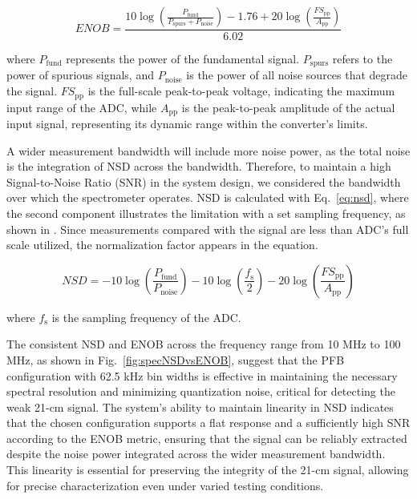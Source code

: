 \documentclass[fleqn,usenatbib]{rasti}
\begin{document}
\begin{equation}
    ENOB = \frac{10 \log\left(\frac{P_{\text{fund}}}{P_{\text{spurs}} + P_{\text{noise}}}\right) - 1.76 + 20 \log\left(\frac{FS_{\text{pp}}}{A_{\text{pp}}}\right)}{6.02}
    \label{eq:enob}
\end{equation}

where \( P_{\text{fund}} \) represents the power of the fundamental signal. \( P_{\text{spurs}} \) refers to the power of spurious signals, and \( P_{\text{noise}} \) is the power of all noise sources that degrade the signal. \( FS_{\text{pp}} \) is the full-scale peak-to-peak voltage, indicating the maximum input range of the ADC, while \( A_{\text{pp}} \) is the peak-to-peak amplitude of the actual input signal, representing its dynamic range within the converter's limits.

A wider measurement bandwidth will include more noise power, as the total noise is the integration of NSD across the bandwidth. Therefore, to maintain a high Signal-to-Noise Ratio (SNR) in the system design, we considered the bandwidth over which the spectrometer operates. NSD is calculated with Eq.~\ref{eq:nsd}, where the second component illustrates the limitation with a set sampling frequency, as shown in \cite{XilinxRF2017}. Since measurements compared with the signal are less than ADC's full scale utilized, the normalization factor appears in the equation.

\begin{equation}
    NSD = -10 \log\left(\frac{P_{\text{fund}}}{P_{\text{noise}}}\right) - 10\log\left(\frac{f_{\text{s}}}{2}\right) - 20\log\left(\frac{FS_{\text{pp}}}{A_{\text{pp}}}\right)
    \label{eq:nsd}
\end{equation}

where \( f_{\text{s}} \) is the sampling frequency of the ADC.

The consistent NSD and ENOB across the frequency range from 10 MHz to 100 MHz, as shown in Fig.~\ref{fig:specNSDvsENOB}, suggest that the PFB configuration with 62.5 kHz bin widths is effective in maintaining the necessary spectral resolution and minimizing quantization noise, critical for detecting the weak 21-cm signal. The system's ability to maintain linearity in NSD indicates that the chosen configuration supports a flat response and a sufficiently high SNR according to the ENOB metric, ensuring that the signal can be reliably extracted despite the noise power integrated across the wider measurement bandwidth. This linearity is essential for preserving the integrity of the 21-cm signal, allowing for precise characterization even under varied testing conditions.
\end{document}
